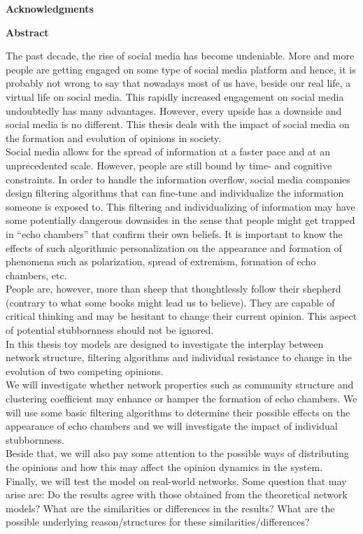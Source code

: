 \documentclass[11 pt , letterpaper , twoside , openright]{book}
\newenvironment{abstract}%
{\cleardoublepage\null \vfill\begin{center}\bfseries \abstractname \end{center}}{\vfill\null}
\begin{document}
\pagestyle{plain}
\renewcommand{\abstractname}{Acknowledgments}
\begin{abstract}

\end{abstract}

\renewcommand{\abstractname}{Abstract}
\begin{abstract}
The past decade, the rise of social media has become undeniable. More and more people are getting engaged on some type of social media platform and hence, it is probably not wrong to say that nowadays most of us have, beside our real life, a virtual life on social media. This rapidly increased engagement on social media undoubtedly has many advantages. However, every upside has a downside and social media is no different. This thesis deals with the impact of social media on the formation and evolution of opinions in society.\\ 
Social media allows for the spread of information at a faster pace and at an unprecedented scale. However, people are still bound by time- and cognitive constraints. In order to handle the information overflow, social media companies design filtering algorithms that can fine-tune and individualize the information someone is exposed to. This filtering and individualizing of information may have some potentially dangerous downsides in the sense that people might get trapped in ``echo chambers'' that confirm their own beliefs. It is important to know the effects of such algorithmic personalization on the appearance and formation of phenomena such as polarization, spread of extremism, formation of echo chambers, etc.\\
People are, however, more than sheep that thoughtlessly follow their shepherd (contrary to what some books might lead us to believe). They are capable of critical thinking and may be hesitant to change their current opinion. This aspect of potential stubbornness should not be ignored.\\
In this thesis toy models are designed to investigate the interplay between network structure, filtering algorithms and individual resistance to change in the evolution of two competing opinions.\\
We will investigate whether network properties such as community structure and clustering coefficient may enhance or hamper the formation of echo chambers. We will use some basic filtering algorithms to determine their possible effects on the appearance of echo chambers and we will investigate the impact of individual stubbornness. \\
Beside that, we will also pay some attention to the possible ways of distributing the opinions and how this may affect the opinion dynamics in the system. \\
Finally, we will test the model on real-world networks. Some question that may arise are: Do the results agree with those obtained from the theoretical network models? What are the similarities or differences in the results? What are the possible underlying reason/structures for these similarities/differences?\\


\end{abstract}
\end{document}
